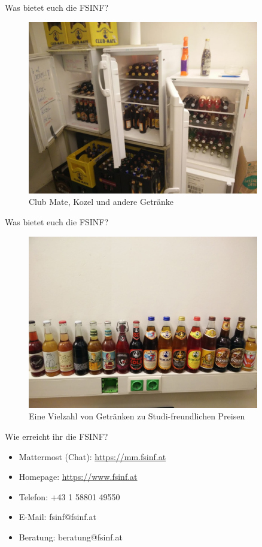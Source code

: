 \documentclass{beamer}
\begin{document}
\begin{frame}{Was bietet euch die FSINF?}
    \begin{figure}[htp]
        \centering
        \includegraphics[width=0.9\textwidth]{kuehlschrank.jpg}
        \caption{Club Mate, Kozel und andere Getränke}
    \end{figure}
\end{frame}

\begin{frame}{Was bietet euch die FSINF?}
    \begin{figure}[htp]
        \centering
        \includegraphics[width=0.9\textwidth]{getraenke.jpg}
        \caption{Eine Vielzahl von Getränken zu Studi-freundlichen Preisen}
    \end{figure}
\end{frame}

\begin{frame}{Wie erreicht ihr die FSINF?}
    \begin{itemize}
        \item Mattermost (Chat): \url{https://mm.fsinf.at}
        \item Homepage: \url{https://www.fsinf.at}
        \item Telefon: +43 1 58801 49550
        \item E-Mail: fsinf@fsinf.at
        \item Beratung: beratung@fsinf.at
    \end{itemize}
\end{frame}
\end{document}
